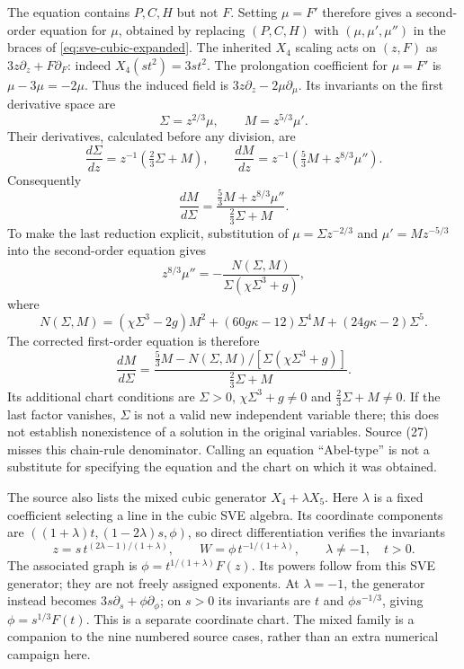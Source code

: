 The equation contains $P,C,H$ but not $F$. Setting $\mu=F'$ therefore
gives a second-order equation for $\mu$, obtained by replacing
$(P,C,H)$ with $(\mu,\mu',\mu'')$ in the braces of
\eqref{eq:sve-cubic-expanded}. The inherited $X_4$ scaling acts on
$(z,F)$ as $3z\partial_z+F\partial_F$: indeed $X_4(st^2)=3st^2$.
The prolongation coefficient for $\mu=F'$ is $\mu-3\mu=-2\mu$.
Thus the induced field is $3z\partial_z-2\mu\partial_\mu$.
Its invariants on the first derivative space are
\[
 \Sigma=z^{2/3}\mu,\qquad M=z^{5/3}\mu'.
\]
Their derivatives, calculated before any division, are
\[
 \frac{d\Sigma}{dz}=z^{-1}(\tfrac23\Sigma+M),\qquad
 \frac{dM}{dz}=z^{-1}(\tfrac53M+z^{8/3}\mu'').
\]
Consequently
\begin{equation}
 \frac{dM}{d\Sigma}=
 \frac{\tfrac53M+z^{8/3}\mu''}{\tfrac23\Sigma+M}.
 \label{eq:sve-repro-mu}
\end{equation}
To make the last reduction explicit, substitution of
$\mu=\Sigma z^{-2/3}$ and $\mu'=Mz^{-5/3}$ into the second-order
equation gives
\[
 z^{8/3}\mu''=-\frac{N(\Sigma,M)}{\Sigma(\chi\Sigma^3+g)},
\]
where
\[
 N(\Sigma,M)=(\chi\Sigma^3-2g)M^2
       +(60g\kappa-12)\Sigma^4M+(24g\kappa-2)\Sigma^5.
\]
The corrected first-order equation is therefore
\begin{equation}
 \frac{dM}{d\Sigma}=
 \frac{\tfrac53M-N(\Sigma,M)/[\Sigma(\chi\Sigma^3+g)]}
      {\tfrac23\Sigma+M}.
 \label{eq:sve-cubic-first-order}
\end{equation}
Its additional chart conditions are $\Sigma>0$,
$\chi\Sigma^3+g\ne0$ and $\tfrac23\Sigma+M\ne0$.
If the last factor vanishes, $\Sigma$ is not a valid new independent
variable there; this does not establish nonexistence of a solution in the
original variables. Source (27) misses this chain-rule denominator.
Calling an equation ``Abel-type'' is not a substitute for specifying the
equation and the chart on which it was obtained.

The source also lists the mixed cubic generator $X_4+\lambda X_5$.
Here $\lambda$ is a fixed coefficient selecting a line in the cubic SVE
algebra. Its coordinate components are
$((1+\lambda)t,(1-2\lambda)s,\phi)$, so direct differentiation
verifies the invariants
\[
 z=s\,t^{(2\lambda-1)/(1+\lambda)},\qquad
 W=\phi\,t^{-1/(1+\lambda)},\qquad \lambda\ne-1,\quad t>0.
\]
The associated graph is $\phi=t^{1/(1+\lambda)}F(z)$.
Its powers follow from this SVE generator; they are not freely assigned
exponents. At $\lambda=-1$, the generator instead becomes
$3s\partial_s+\phi\partial_\phi$; on $s>0$ its invariants are
$t$ and $\phi s^{-1/3}$, giving $\phi=s^{1/3}F(t)$.
This is a separate coordinate chart. The mixed family is a companion to
the nine numbered source cases, rather than an extra numerical campaign here.

